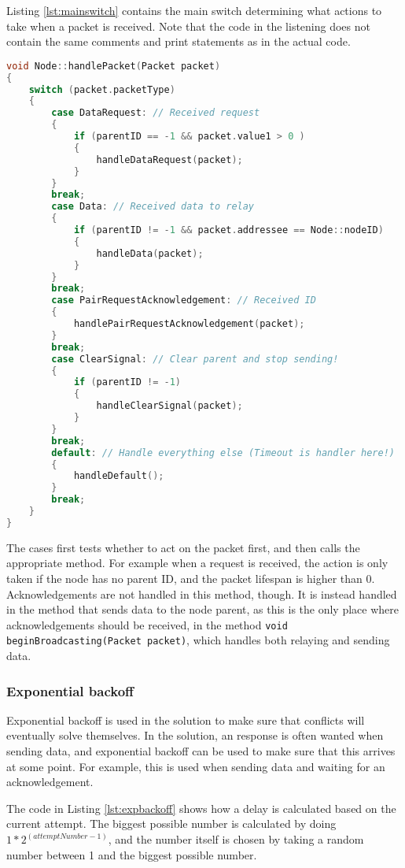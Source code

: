 Listing \ref{lst:mainswitch} contains the main switch determining what actions to take when a packet is received. Note that the code in the listening does not contain the same comments and print statements as in the actual code.
\begin{lstlisting}[language=C,caption={The packet handling method.},label={lst:mainswitch}]
void Node::handlePacket(Packet packet)
{
    switch (packet.packetType)
    {
        case DataRequest: // Received request
        {
            if (parentID == -1 && packet.value1 > 0 )
            {
                handleDataRequest(packet);
            }
        }
        break;
        case Data: // Received data to relay
        {
            if (parentID != -1 && packet.addressee == Node::nodeID)
            {
                handleData(packet);
            }
        }
        break;
        case PairRequestAcknowledgement: // Received ID
        {
            handlePairRequestAcknowledgement(packet);
        }
        break;
        case ClearSignal: // Clear parent and stop sending!
        {
            if (parentID != -1)
            {
                handleClearSignal(packet);
            }
        }
        break;
        default: // Handle everything else (Timeout is handler here!)
        {
            handleDefault();
        }
        break;
    }
}
\end{lstlisting}
The cases first tests whether to act on the packet first, and then calls the appropriate method. For example when a request is received, the action is only taken if the node has no parent ID, and the packet lifespan is higher than 0. Acknowledgements are not handled in this method, though. It is instead handled in the method that sends data to the node parent, as this is the only place where acknowledgements should be received, in the method \texttt{void beginBroadcasting(Packet packet)}, which handles both relaying and sending data.


\subsubsection*{Exponential backoff}
Exponential backoff is used in the solution to make sure that conflicts will eventually solve themselves. In the solution, an response is often wanted when sending data, and exponential backoff can be used to make sure that this arrives at some point. For example, this is used when sending data and waiting for an acknowledgement.

The code in Listing \ref{lst:expbackoff} shows how a delay is calculated based on the current attempt.
The biggest possible number is calculated by doing $1 * 2^(attemptNumber-1)$, and the number itself is chosen by taking a random number between 1 and the biggest possible number.

